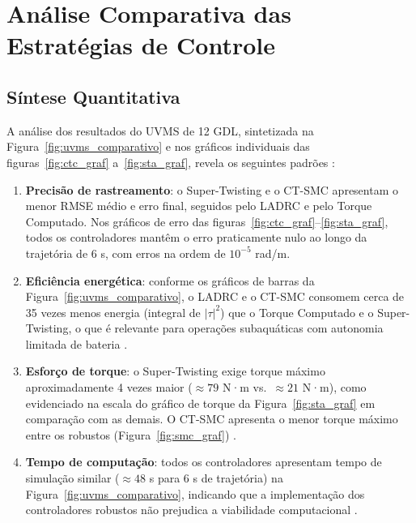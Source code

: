 \section{Análise Comparativa das Estratégias de Controle}
\label{sec:analise_comparativa}

\subsection{Síntese Quantitativa}

A análise dos resultados do UVMS de 12 GDL, sintetizada na Figura~\ref{fig:uvms_comparativo} e nos gráficos individuais das figuras~\ref{fig:ctc_graf} a~\ref{fig:sta_graf}, revela os seguintes padrões \cite{slotine1991applied, craig1989introduction, gao2003scaling, spong2020robot}:

\begin{enumerate}
    \item \textbf{Precisão de rastreamento}: o Super-Twisting e o CT-SMC apresentam o menor RMSE médio e erro final, seguidos pelo LADRC e pelo Torque Computado. Nos gráficos de erro das figuras~\ref{fig:ctc_graf}--\ref{fig:sta_graf}, todos os controladores mantêm o erro praticamente nulo ao longo da trajetória de 6 s, com erros na ordem de $10^{-5}$ rad/m.

    \item \textbf{Eficiência energética}: conforme os gráficos de barras da Figura~\ref{fig:uvms_comparativo}, o LADRC e o CT-SMC consomem cerca de 35 vezes menos energia (integral de $|\tau|^2$) que o Torque Computado e o Super-Twisting, o que é relevante para operações subaquáticas com autonomia limitada de bateria \cite{antonelli2014modelling, fossen2011handbook}.

    \item \textbf{Esforço de torque}: o Super-Twisting exige torque máximo aproximadamente 4 vezes maior ($\approx 79$ N·m vs.\ $\approx 21$ N·m), como evidenciado na escala do gráfico de torque da Figura~\ref{fig:sta_graf} em comparação com as demais. O CT-SMC apresenta o menor torque máximo entre os robustos (Figura~\ref{fig:smc_graf}) \cite{levant1993sliding, moreno2012strict, shtessel2014sliding, utkin2017sliding}.

    \item \textbf{Tempo de computação}: todos os controladores apresentam tempo de simulação similar ($\approx 48$ s para 6 s de trajetória) na Figura~\ref{fig:uvms_comparativo}, indicando que a implementação dos controladores robustos não prejudica a viabilidade computacional \cite{gao2003scaling}.
\end{enumerate}


